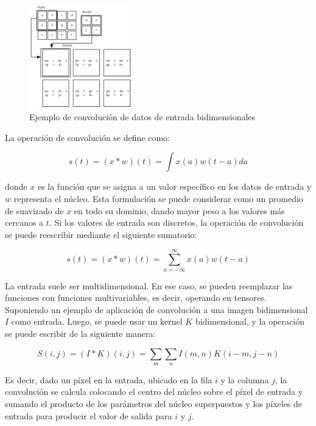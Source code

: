 \begin{figure}[ht]
\centering
\includegraphics[width=0.4\textwidth]{img/chapters/estado-del-arte/ejemplo-convolucion.png}
\caption{\label{fig:ejemplo-convolucion}Ejemplo de convolución de datos de entrada bidimensionales \cite{ankile2020deep}}
\end{figure}

La operación de convolución se define como:

\begin{equation}
\label{eq:operacion-convolucion1}
s(t) = (x*w)(t) = \int x(a)w(t-a)da
\end{equation}

donde $x$ es la función que se asigna a un valor específico en los datos de entrada y $w$ representa el núcleo. Esta formulación se puede considerar como un promedio de suavizado de $x$ en todo su dominio, dando mayor peso a los valores más cercanos a $t$. Si los valores de entrada son discretos, la operación de convolución se puede reescribir mediante el siguiente sumatorio:

\begin{equation}
\label{eq:operacion-convolucion2}
s(t) = (x*w)(t) = \sum_{a=-\infty}^\infty x(a)w(t-a)
\end{equation}

La entrada suele ser multidimensional. En ese caso, se pueden reemplazar las funciones con funciones multivariables, es decir, operando en tensores. Suponiendo un ejemplo de aplicación de convolución a una imagen bidimensional $I$ como entrada. Luego, se puede usar un kernel $K$ bidimensional, y la operación se puede escribir de la siguiente manera:

\begin{equation}
\label{eq:operacion-convolucion3}
S(i,j) = (I*K)(i,j) = \sum_{m} \sum_{n} I(m,n) K (i - m, j - n)
\end{equation}

Es decir, dado un píxel en la entrada, ubicado en la fila $i$ y la columna $j$, la convolución se calcula colocando el centro del núcleo sobre el píxel de entrada y sumando el producto de los parámetros del núcleo superpuestos y los píxeles de entrada para producir el valor de salida para $i$ y $j$.

